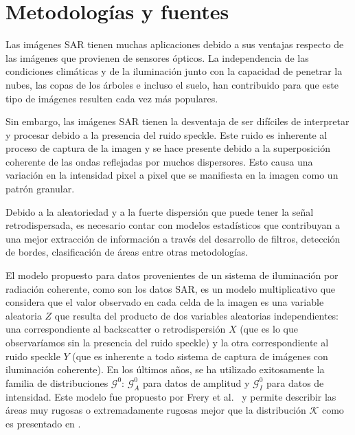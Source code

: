 \documentclass[11pt]{article}
\begin{document}
\section{Metodologías y fuentes}

Las imágenes SAR tienen muchas aplicaciones debido a sus ventajas respecto de las imágenes que provienen de sensores ópticos. La independencia de las condiciones climáticas y de la iluminación junto con la capacidad de penetrar la nubes, las copas de los árboles e incluso el suelo, han contribuido para que este tipo de imágenes resulten cada vez más populares.

Sin embargo, las imágenes SAR tienen la desventaja de ser difíciles de interpretar y procesar debido a la presencia del ruido speckle. Este ruido es inherente al proceso de captura de la imagen y se hace presente debido a la superposición coherente de las ondas reflejadas por muchos dispersores. Esto causa una variación en la intensidad pixel a pixel que se manifiesta en la imagen como un patrón granular. 

Debido a la aleatoriedad y a la fuerte dispersión que puede tener la señal retrodispersada, es necesario contar con modelos estadísticos que contribuyan a una mejor extracción de información a través del desarrollo de filtros, detección de bordes, clasificación de áreas entre otras metodologías. 


El modelo propuesto para datos provenientes de un sistema de iluminación por radiación coherente, como son los datos SAR, es un modelo multiplicativo que considera que el valor observado en cada celda de la imagen es una variable aleatoria $Z$ que resulta del producto de dos variables aleatorias independientes: una correspondiente al backscatter o retrodispersión $X$ (que es lo que observaríamos sin la presencia del ruido speckle) y la otra correspondiente al ruido speckle $Y$ (que es inherente a todo sistema de captura de imágenes con iluminación coherente). En los últimos años, se ha utilizado exitosamente la familia de distribuciones $\mathcal{G}^0$: $\mathcal{G}_A^0$ para datos de amplitud y $\mathcal G_I^0$ para datos de intensidad. Este modelo fue propuesto por Frery et al.~\cite{Frery97} y permite describir las áreas muy rugosas o extremadamente rugosas mejor que la distribución $\mathcal{K}$ como es presentado en \cite{Jakeman87}.
\end{document}
